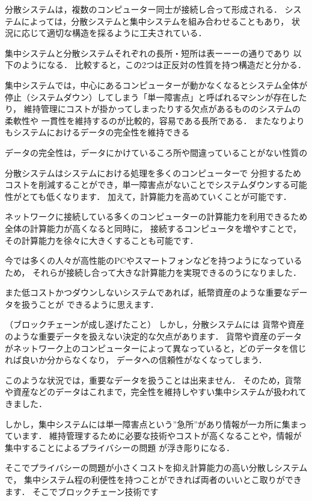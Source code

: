 \documentclass[a4paper,12pt]{jsarticle}
\begin{document}
分散システムは，複数のコンピューター同士が接続し合って形成される．
システムによっては，分散システムと集中システムを組み合わせることもあり，
状況に応じて適切な構造を採るように工夫されている．

集中システムと分散システムそれぞれの長所・短所は表ーーーの通りであり
以下のようになる．
比較すると，この2つは正反対の性質を持つ構造だと分かる．

集中システムでは，中心にあるコンピューターが動かなくなるとシステム全体が
停止（システムダウン）してしまう「単一障害点」と呼ばれるマシンが存在したり，
維持管理にコストが掛かってしまったりする欠点があるもののシステムの柔軟性や
一貫性を維持するのが比較的，容易である長所である．
またなりよりもシステムにおけるデータの完全性を維持できる

データの完全性は，データにかけているころ所や間違っていることがない性質の

分散システムはシステムにおける処理を多くのコンピューターで
分担するためコストを削減することができ，単一障害点がないことでシステムダウンする可能性がとても低くなります．
加えて，計算能力を高めていくことが可能です．

ネットワークに接続している多くのコンピューターの計算能力を利用できるため全体の計算能力が高くなると同時に，
接続するコンピュータを増やすことで，その計算能力を徐々に大きくすることも可能です．

今では多くの人々が高性能のPCやスマートフォンなどを持つようになっているため，
それらが接続し合って大きな計算能力を実現できるのうになりました．

また低コストかつダウンしないシステムであれば，紙幣資産のような重要なデータを扱うことが
できるように思えます．

（ブロックチェーンが成し遂げたこと）
しかし，分散システムには
貨幣や資産のような重要データを扱えない決定的な欠点があります．
貨幣や資産のデータがネットワーク上のコンピューターによって異なっていると，どのデータを信じれば良いか分からなくなり，
データへの信頼性がなくなってしまう．

このような状況では，重要なデータを扱うことは出来ません．
そのため，貨幣や資産などのデータはこれまで，完全性を維持しやすい集中システムが扱われてきました．

しかし，集中システムには単一障害点という”急所”があり情報が一カ所に集まっています．
維持管理するために必要な技術やコストが高くなることや，情報が集中することによるプライバシーの問題
が浮き彫りになる．

そこでプライバシーの問題が小さくコストを抑え計算能力の高い分散しシステムで，
集中システム程の利便性を持つことができれば両者のいいとこ取りができます．
そこでブロックチェーン技術です
\end{document}

